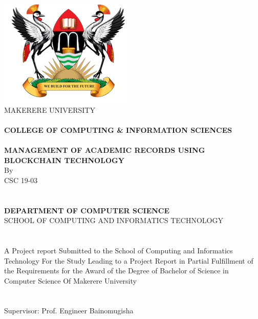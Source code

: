 \begin{titlepage}
\begin{center}

		\includegraphics{images/muklogo2.png} \\
		
\huge{MAKERERE UNIVERSITY}\\~\\

\textbf{COLLEGE OF COMPUTING \& INFORMATION SCIENCES}\\~\\

\textbf{MANAGEMENT OF ACADEMIC RECORDS USING BLOCKCHAIN TECHNOLOGY}\\
By \\ 
CSC 19-03\\~\\~\\
\textbf{DEPARTMENT OF COMPUTER SCIENCE}\\
\normalsize{SCHOOL OF COMPUTING AND INFORMATICS TECHNOLOGY}\\~\\~\\
A Project report Submitted to the School of Computing and Informatics Technology
For the Study Leading to a Project Report in Partial Fulfillment of the
Requirements for the Award of the Degree of Bachelor of Science in Computer Science 
Of Makerere University\\~\\~\\
Supervisor: Prof. Engineer Bainomugisha\\~\\


\end{center}
\end{titlepage}
